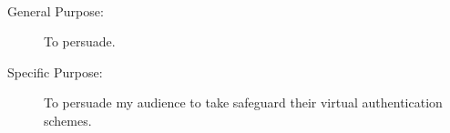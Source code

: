 \documentclass{article}
\begin{document}
  \mbox{}\\[-.2cm]
  \begin{description}
    \item[General Purpose:] To persuade.
    \item[Specific Purpose:] To persuade my audience to take safeguard their virtual authentication schemes.
  \end{description}
\end{document}
